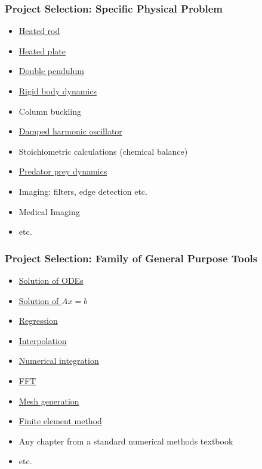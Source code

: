 \documentclass[t,12pt,numbers,fleqn]{beamer}
\begin{document}
\begin{frame}
\frametitle{Project Selection: Specific Physical Problem}
\begin{itemize}
\item
  \href{https://ocw.mit.edu/courses/mathematics/18-303-linear-partial-differential-equations-fall-2006/lecture-notes/heateqni.pdf}{
    Heated
    rod}
\item \href{http://www.tech.plym.ac.uk/sme/THER204B-web/Heatran2.PDF}{Heated plate}
\item \href{https://en.wikipedia.org/wiki/Double_pendulum}{Double pendulum}
\item \href{http://chrishecker.com/Rigid_Body_Dynamics}{Rigid body dynamics}
\item Column buckling
\item \href{https://en.wikipedia.org/wiki/Harmonic_oscillator}{Damped harmonic oscillator}
\item Stoichiometric calculations (chemical balance)
\item
  \href{http://www.tiem.utk.edu/~gross/bioed/bealsmodules/predator-prey.html}{Predator
    prey dynamics}
\item Imaging: filters, edge detection etc.
\item Medical Imaging
\item etc.
\end{itemize}

\end{frame}


\begin{frame}
\frametitle{Project Selection: Family of General Purpose Tools}
\begin{itemize}
\item \href{https://en.wikipedia.org/wiki/Numerical_methods_for_ordinary_differential_equations}{Solution of ODEs}
\item \href{https://en.wikibooks.org/wiki/Numerical_Methods/Solution_of_Linear_Equation_Systems}{Solution of $A x = b$}
\item \href{https://en.wikipedia.org/wiki/Linear_regression}{Regression}
\item \href{https://en.wikibooks.org/wiki/Introduction_to_Numerical_Methods/Interpolation}{Interpolation}
\item \href{https://en.wikipedia.org/wiki/Numerical_integration}{Numerical integration}
\item \href{https://en.wikipedia.org/wiki/Fast_Fourier_transform}{FFT}
\item \href{https://en.wikipedia.org/wiki/Mesh_generation}{Mesh generation}
\item \href{https://en.wikipedia.org/wiki/Finite_element_method}{Finite element method}
\item Any chapter from a standard numerical methods textbook
\item etc.
\end{itemize}
\end{frame}
\end{document}
